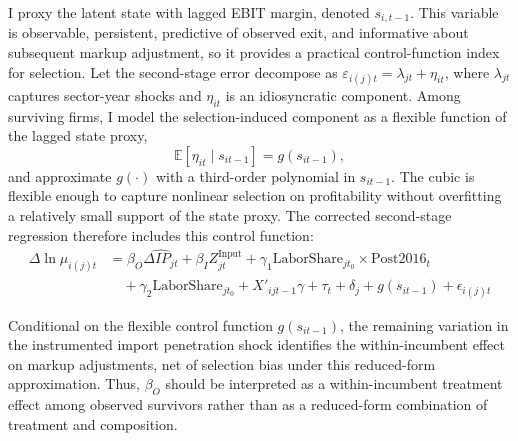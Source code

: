 \documentclass[12pt]{article}
\begin{document}
I proxy the latent state with lagged EBIT margin, denoted $s_{i,t-1}$. This variable is observable, persistent, predictive of observed exit, and informative about subsequent markup adjustment, so it provides a practical control-function index for selection. Let the second-stage error decompose as $\varepsilon_{i(j)t} = \lambda_{jt} + \eta_{it}$, where $\lambda_{jt}$ captures sector-year shocks and $\eta_{it}$ is an idiosyncratic component. Among surviving firms, I model the selection-induced component as a flexible function of the lagged state proxy,
\[
\mathbb{E}[\eta_{it} \mid s_{it-1}] = g(s_{it-1}),
\]
and approximate $g(\cdot)$ with a third-order polynomial in $s_{it-1}$. The cubic is flexible enough to capture nonlinear selection on profitability without overfitting a relatively small support of the state proxy. The corrected second-stage regression therefore includes this control function:
\begin{equation}
\begin{aligned}
\Delta \ln \mu_{i(j)t} &= \beta_O \widehat{\Delta IP_{jt}} + \beta_I Z_{jt}^{\text{Input}} + \gamma_1 \text{LaborShare}_{jt_0} \times \text{Post2016}_t \\
&\quad + \gamma_2 \text{LaborShare}_{jt_0} + X'_{ijt-1} \gamma + \tau_t + \delta_j + g(s_{it-1}) + \epsilon_{i(j)t}
\end{aligned}
\end{equation}

Conditional on the flexible control function $g(s_{it-1})$, the remaining variation in the instrumented import penetration shock identifies the within-incumbent effect on markup adjustments, net of selection bias under this reduced-form approximation. Thus, $\beta_O$ should be interpreted as a within-incumbent treatment effect among observed survivors rather than as a reduced-form combination of treatment and composition. 
\end{document}
